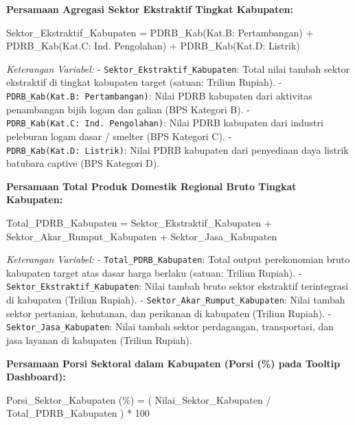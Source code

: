 \documentclass[
]{article}
\newenvironment{Shaded}{}{}
\newcommand{\NormalTok}[1]{#1}
\begin{document}
\textbf{Persamaan Agregasi Sektor Ekstraktif Tingkat Kabupaten:}

\begin{Shaded}
\begin{Highlighting}[]
\NormalTok{Sektor\_Ekstraktif\_Kabupaten = PDRB\_Kab(Kat.B: Pertambangan) + PDRB\_Kab(Kat.C: Ind. Pengolahan) + PDRB\_Kab(Kat.D: Listrik)}
\end{Highlighting}
\end{Shaded}

\emph{Keterangan Variabel:} - \texttt{Sektor\_Ekstraktif\_Kabupaten}:
Total nilai tambah sektor ekstraktif di tingkat kabupaten target
(satuan: Triliun Rupiah). - \texttt{PDRB\_Kab(Kat.B:\ Pertambangan)}:
Nilai PDRB kabupaten dari aktivitas penambangan bijih logam dan galian
(BPS Kategori B). - \texttt{PDRB\_Kab(Kat.C:\ Ind.\ Pengolahan)}: Nilai
PDRB kabupaten dari industri peleburan logam dasar / smelter (BPS
Kategori C). - \texttt{PDRB\_Kab(Kat.D:\ Listrik)}: Nilai PDRB kabupaten
dari penyediaan daya listrik batubara captive (BPS Kategori D).

\textbf{Persamaan Total Produk Domestik Regional Bruto Tingkat
Kabupaten:}

\begin{Shaded}
\begin{Highlighting}[]
\NormalTok{Total\_PDRB\_Kabupaten = Sektor\_Ekstraktif\_Kabupaten + Sektor\_Akar\_Rumput\_Kabupaten + Sektor\_Jasa\_Kabupaten}
\end{Highlighting}
\end{Shaded}

\emph{Keterangan Variabel:} - \texttt{Total\_PDRB\_Kabupaten}: Total
output perekonomian bruto kabupaten target atas dasar harga berlaku
(satuan: Triliun Rupiah). - \texttt{Sektor\_Ekstraktif\_Kabupaten}:
Nilai tambah bruto sektor ekstraktif terintegrasi di kabupaten (Triliun
Rupiah). - \texttt{Sektor\_Akar\_Rumput\_Kabupaten}: Nilai tambah sektor
pertanian, kehutanan, dan perikanan di kabupaten (Triliun Rupiah). -
\texttt{Sektor\_Jasa\_Kabupaten}: Nilai tambah sektor perdagangan,
transportasi, dan jasa layanan di kabupaten (Triliun Rupiah).

\textbf{Persamaan Porsi Sektoral dalam Kabupaten (Porsi (\%) pada
Tooltip Dashboard):}

\begin{Shaded}
\begin{Highlighting}[]
\NormalTok{Porsi\_Sektor\_Kabupaten (\%) = ( Nilai\_Sektor\_Kabupaten / Total\_PDRB\_Kabupaten ) * 100}
\end{Highlighting}
\end{Shaded}
\end{document}
